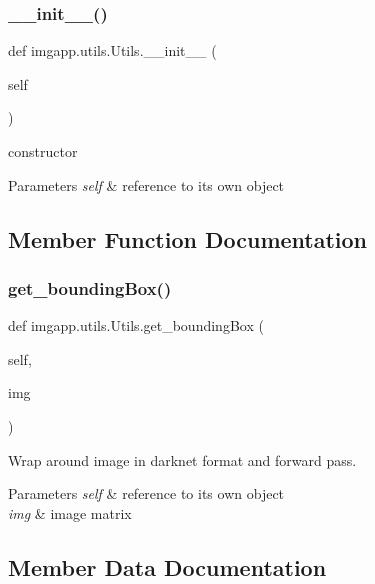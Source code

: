 \subsubsection{\texorpdfstring{\+\_\+\+\_\+init\+\_\+\+\_\+()}{\_\_init\_\_()}}
{\footnotesize\ttfamily def imgapp.\+utils.\+Utils.\+\_\+\+\_\+init\+\_\+\+\_\+ (\begin{DoxyParamCaption}\item[{}]{self }\end{DoxyParamCaption})}



constructor 


\begin{DoxyParams}{Parameters}
{\em self} & reference to it\textquotesingle{}s own object \\
\hline
\end{DoxyParams}


\subsection{Member Function Documentation}
\mbox{\label{classimgapp_1_1utils_1_1Utils_aceeb858cb98ce6b5f7aa1d5e2c599490}} 
\subsubsection{\texorpdfstring{get\+\_\+bounding\+Box()}{get\_boundingBox()}}
{\footnotesize\ttfamily def imgapp.\+utils.\+Utils.\+get\+\_\+bounding\+Box (\begin{DoxyParamCaption}\item[{}]{self,  }\item[{}]{img }\end{DoxyParamCaption})}



Wrap around image in darknet format and forward pass. 


\begin{DoxyParams}{Parameters}
{\em self} & reference to it\textquotesingle{}s own object \\
\hline
{\em img} & image matrix \\
\hline
\end{DoxyParams}


\subsection{Member Data Documentation}
\mbox{\label{classimgapp_1_1utils_1_1Utils_adb7539784726cf1477e24ed2433e6f72}} 

